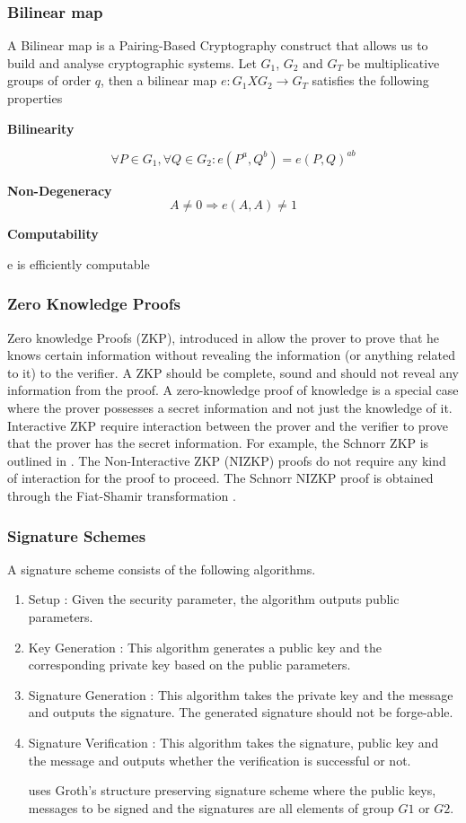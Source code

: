 \documentclass[journal]{IEEEtran}
\begin{document}
\subsubsection{Bilinear map}
A Bilinear map is a Pairing-Based Cryptography construct that allows us to build and analyse cryptographic systems. Let $G_1$, $G_2$ and $G_T$ be multiplicative groups of order $q$, then a bilinear map $e : G_1 X G_2\rightarrow G_T$ satisfies the following properties

\textbf{Bilinearity}

$$\forall P \in G_1, \forall Q \in G_2 : e(P^a, Q^b) = e(P,Q)^{ab}$$

\textbf{Non-Degeneracy}
$$ A \neq 0 \Rightarrow e(A,A) \neq 1$$

\textbf{Computability}

e is efficiently computable

\subsubsection{Zero Knowledge Proofs}
Zero knowledge Proofs (ZKP), introduced in \cite{zkp} allow the prover to prove that he knows certain information without revealing the information (or anything related to it) to the verifier. A ZKP should be complete, sound and should not reveal any information from the proof. A zero-knowledge proof of knowledge is a special case where the prover possesses a secret information and not just the knowledge of it. Interactive ZKP require interaction between the prover and the verifier to prove that the prover has the secret information. For example, the Schnorr ZKP is outlined in \cite{rfc8235}. The Non-Interactive ZKP (NIZKP) proofs do not require any kind of interaction for the proof to proceed. The Schnorr NIZKP proof is obtained through the Fiat-Shamir transformation \cite{Fiat1986HowTP}.

\subsubsection{Signature Schemes}
A signature scheme consists of the following algorithms.
\begin{enumerate}[label=\alph*)]
	\item Setup : Given the security parameter, the algorithm outputs public parameters.
	\item Key Generation : This algorithm generates a public key and the corresponding private key based on the public parameters.
	\item Signature Generation : This algorithm takes the private key and the message and outputs the signature. The generated signature should not be forge-able.
	\item Signature Verification : This algorithm takes the signature, public key and the message and outputs whether the verification is successful or not.
	
\cite{CamenischDD17} uses Groth's structure preserving signature scheme \cite{groth} where the public keys, messages to be signed and the signatures are all elements of group $G1$ or $G2$.

\end{enumerate}
\end{document}
